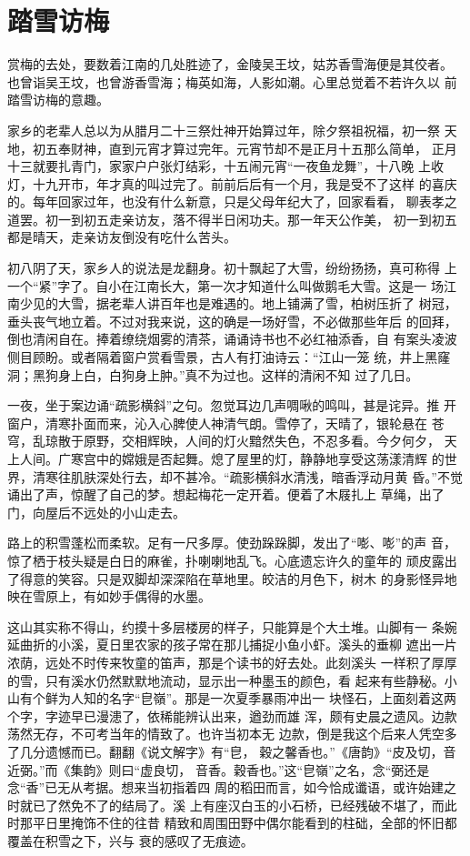 \chapter{踏雪访梅}

赏梅的去处，要数着江南的几处胜迹了，金陵吴王坟，姑苏香雪海便是其佼者。
也曾诣吴王坟，也曾游香雪海；梅英如海，人影如潮。心里总觉着不若许久以
前踏雪访梅的意趣。

家乡的老辈人总以为从腊月二十三祭灶神开始算过年，除夕祭祖祝福，初一祭
天地，初五奉财神，直到元宵才算过完年。元宵节却不是正月十五那么简单，
正月十三就要扎青门，家家户户张灯结彩，十五闹元宵“一夜鱼龙舞”，十八晚
上收灯，十九开市，年才真的叫过完了。前前后后有一个月，我是受不了这样
的喜庆的。每年回家过年，也没有什么新意，只是父母年纪大了，回家看看，
聊表孝之道罢。初一到初五走亲访友，落不得半日闲功夫。那一年天公作美，
初一到初五都是晴天，走亲访友倒没有吃什么苦头。

初八阴了天，家乡人的说法是龙翻身。初十飘起了大雪，纷纷扬扬，真可称得
上一个“紧”字了。自小在江南长大，第一次才知道什么叫做鹅毛大雪。这是一
场江南少见的大雪，据老辈人讲百年也是难遇的。地上铺满了雪，柏树压折了
树冠，垂头丧气地立着。不过对我来说，这的确是一场好雪，不必做那些年后
的回拜，倒也清闲自在。捧着缭绕烟雾的清茶，诵诵诗书也不必红袖添香，自
有案头凌波侧目顾盼。或者隔着窗户赏看雪景，古人有打油诗云：“江山一笼
统，井上黑窿洞；黑狗身上白，白狗身上肿。”真不为过也。这样的清闲不知
过了几日。

一夜，坐于案边诵“疏影横斜”之句。忽觉耳边几声啁啾的鸣叫，甚是诧异。推
开窗户，清寒扑面而来，沁入心脾使人神清气朗。雪停了，天晴了，银轮悬在
苍穹，乱琼散于原野，交相辉映，人间的灯火黯然失色，不忍多看。今夕何夕，
天上人间。广寒宫中的嫦娥是否起舞。熄了屋里的灯，静静地享受这荡漾清辉
的世界，清寒往肌肤深处行去，却不甚冷。“疏影横斜水清浅，暗香浮动月黄
昏。”不觉诵出了声，惊醒了自己的梦。想起梅花一定开着。便着了木屐扎上
草绳，出了门，向屋后不远处的小山走去。

路上的积雪蓬松而柔软。足有一尺多厚。使劲跺跺脚，发出了“嘭、嘭”的声
音，惊了栖于枝头疑是白日的麻雀，扑喇喇地乱飞。心底遗忘许久的童年的
顽皮露出了得意的笑容。只是双脚却深深陷在草地里。皎洁的月色下，树木
的身影怪异地映在雪原上，有如妙手偶得的水墨。

这山其实称不得山，约摸十多层楼房的样子，只能算是个大土堆。山脚有一
条婉延曲折的小溪，夏日里农家的孩子常在那儿捕捉小鱼小虾。溪头的垂柳
遮出一片浓荫，远处不时传来牧童的笛声，那是个读书的好去处。此刻溪头
一样积了厚厚的雪，只有溪水仍然默默地流动，显示出一种墨玉的颜色，看
起来有些静秘。小山有个鲜为人知的名字“皀嶺”。那是一次夏季暴雨冲出一
块怪石，上面刻着这两个字，字迹早已漫漶了，依稀能辨认出来，遒劲而雄
浑，颇有史晨之遗风。边款荡然无存，不可考当年的情致了。也许当初本无
边款，倒是我这个后来人凭空多了几分遗憾而已。翻翻《说文解字》有“皀，
穀之馨香也。”《唐韵》“皮及切，音近弼。”而《集韵》则曰“虚良切，
音香。穀香也。”这“皀嶺”之名，念“弼还是念“香”已无从考据。想来当初指着四
周的稻田而言，如今恰成谶语，或许始建之时就已了然免不了的结局了。溪
上有座汉白玉的小石桥，已经残破不堪了，而此时那平日里掩饰不住的往昔
精致和周围田野中偶尔能看到的柱础，全部的怀旧都覆盖在积雪之下，兴与
衰的感叹了无痕迹。

